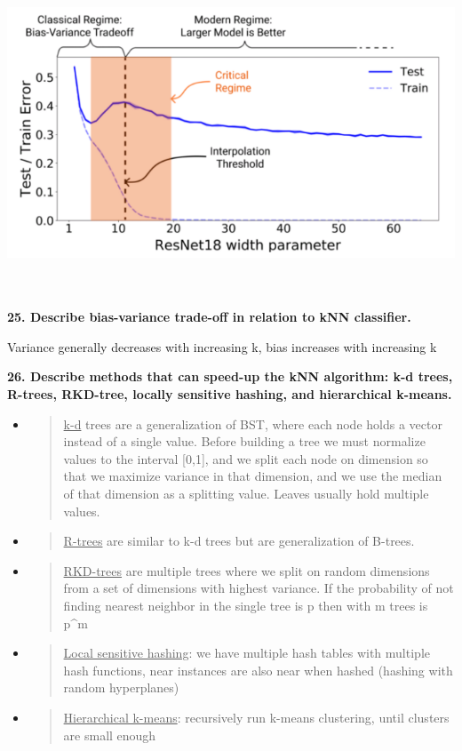 \includegraphics[width=6.70313in,height=3.73592in]{media/image24.png}

\textbf{25. Describe bias-variance trade-off in relation to kNN
classifier.}

Variance generally decreases with increasing k, bias increases with
increasing k

\textbf{26. Describe methods that can speed-up the kNN algorithm: k-d
trees, R-trees, RKD-tree, locally sensitive hashing, and hierarchical
k-means.}

\begin{itemize}
\item
  \begin{quote}
  \underline{k-d} trees are a generalization of BST, where each node
  holds a vector instead of a single value. Before building a tree we
  must normalize values to the interval {[}0,1{]}, and we split each
  node on dimension so that we maximize variance in that dimension, and
  we use the median of that dimension as a splitting value. Leaves
  usually hold multiple values.
  \end{quote}
\item
  \begin{quote}
  \underline{R-trees} are similar to k-d trees but are generalization of
  B-trees.
  \end{quote}
\item
  \begin{quote}
  \underline{RKD-trees} are multiple trees where we split on random
  dimensions from a set of dimensions with highest variance. If the
  probability of not finding nearest neighbor in the single tree is p
  then with m trees is p\^{}m
  \end{quote}
\item
  \begin{quote}
  \underline{Local sensitive hashing}: we have multiple hash tables with
  multiple hash functions, near instances are also near when hashed
  (hashing with random hyperplanes)
  \end{quote}
\item
  \begin{quote}
  \underline{Hierarchical k-means}: recursively run k-means clustering,
  until clusters are small enough
  \end{quote}
\end{itemize}


